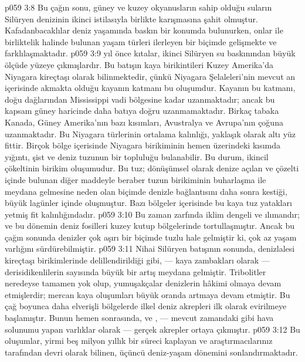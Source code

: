 \vs p059 3:8 Bu çağın sonu, güney ve kuzey okyanusların sahip olduğu suların Silüryen denizinin ikinci istilasıyla birlikte karışmasına şahit olmuştur. Kafadanbacaklılar deniz yaşamında baskın bir konumda bulunurken, onlar ile birliktelik halinde bulunan yaşam türleri ilerleyen bir biçimde gelişmekte ve farklılaşmaktadır.
\vs p059 3:9  yıl önce kıtalar, ikinci Silüryen su baskınından büyük ölçüde yüzeye çıkmışlardır. Bu batışın kaya birikintileri Kuzey Amerika’da Niyagara kireçtaşı olarak bilinmektedir, çünkü Niyagara Şelaleleri’nin mevcut an içerisinde akmakta olduğu kayanın katmanı bu oluşumdur. Kayanın bu katmanı, doğu dağlarından Mississippi vadi bölgesine kadar uzanmaktadır; ancak bu kapsam güney haricinde daha batıya doğru uzanmamaktadır. Birkaç tabaka Kanada, Güney Amerika’nın bazı kısımları, Avustralya ve Avrupa’nın çoğuna uzanmaktadır. Bu Niyagara türlerinin ortalama kalınlığı, yaklaşık olarak altı yüz fittir. Birçok bölge içerisinde Niyagara birikiminin hemen üzerindeki kısımda yığıntı, şist ve deniz tuzunun bir topluluğu bulanabilir. Bu durum, ikincil çökeltinin birikim oluşumudur. Bu tuz; dönüşümsel olarak denize açılan ve çözelti içinde bulunan diğer maddeyle beraber tuzun birikiminin buharlaşma ile meydana gelmesine neden olan biçimde denizle bağlantısını daha sonra kestiği, büyük lagünler içinde oluşmuştur. Bazı bölgeler içerisinde bu kaya tuz yatakları yetmiş fit kalınlığındadır.
\vs p059 3:10 Bu zaman zarfında iklim dengeli ve ılımandır; ve bu dönemin deniz fosilleri kuzey kutup bölgelerinde tortullaşmıştır. Ancak bu çağın sonunda denizler çok aşırı bir biçimde tuzlu hale gelmiştir ki, çok az yaşam varlığını sürdürebilmiştir.
\vs p059 3:11 Nihai Silüryen batışının sonunda, denizlalesi kireçtaşı birikimlerinde delillendirildiği gibi, --- kaya zambakları olarak --- derisidikenlilerin sayısında büyük bir artış meydana gelmiştir. Tribolitler neredeyse tamamen yok olup, yumuşakçalar denizlerin hâkimi olmaya devam etmişlerdir; mercan kaya oluşumları büyük oranda artmaya devam etmiştir. Bu çağ boyunca daha elverişli bölgelerde ilkel deniz akrepleri ilk olarak evirilmeye başlamıştır. Bunun hemen sonrasında, ve , --- mevcut zamandaki gibi hava solunumu yapan varlıklar olarak --- gerçek akrepler ortaya çıkmıştır.
\vs p059 3:12 Bu oluşumlar, yirmi beş milyon yıllık bir süreci kaplayan ve araştırmacılarınız tarafından  devri olarak bilinen, üçüncü deniz\hyp{}yaşam dönemini sonlandırmaktadır.
